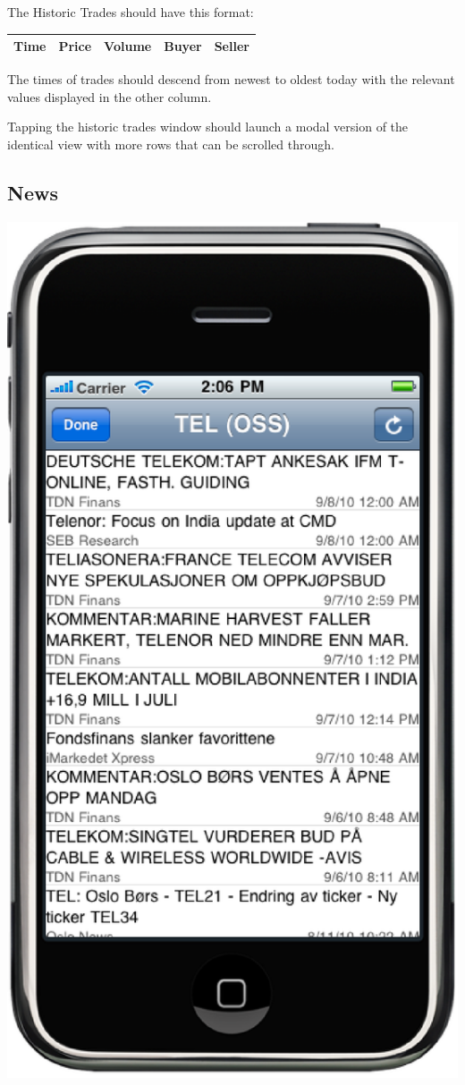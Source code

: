 \documentclass[12pt,twoside,letterpaper]{report}
\begin{document}
The Historic Trades should have this format:
\begin{tabular}{ l l l l l }
\hline
Time & Price & Volume & Buyer & Seller \\
\hline
\end{tabular}

The times of trades should descend from newest to oldest today with the relevant values displayed in the other column.

Tapping the historic trades window should launch a modal version of the identical view with more rows that can be scrolled through.

\subsection*{News}
\includegraphics[scale=0.5]{symbolDetailNewsHeadings}
\end{document}
